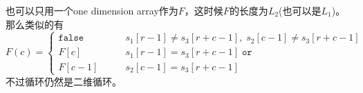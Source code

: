 也可以只用一个one dimension array作为$F$，这时候$F$的长度为$L_2$(也可以是$L_1$)。那么类似的有
\[
F(c) = 
\begin{cases}
\texttt{false} &\qquad s_1[r-1]\neq s_3[r+c-1], \;s_2[c-1]\neq s_3[r+c-1]\\
F[c] &\qquad s_1[r-1]= s_3[r+c-1] \; \texttt{or} \\
F[c-1] &\qquad s_2[c-1]= s_3[r+c-1] 
\end{cases}
\]
不过循环仍然是二维循环。